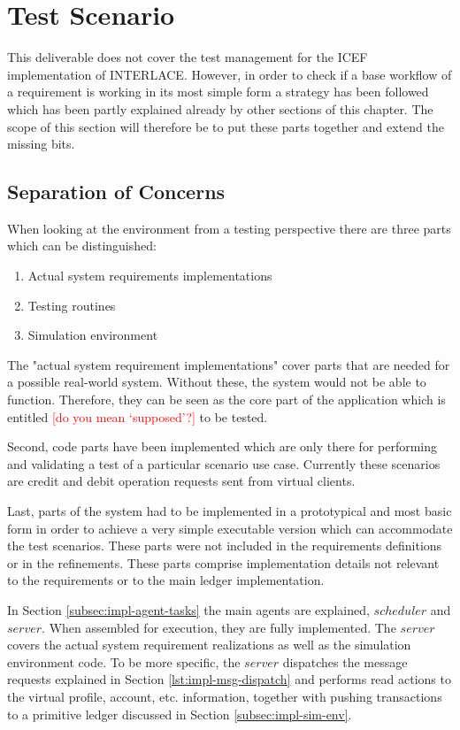 \section{Test Scenario}
\label{sec:impl-test}

This deliverable does not cover the test management for the ICEF implementation of INTERLACE. However, in order to check if a base workflow of a requirement is working in its most simple form a strategy has been followed which has been partly explained already by other sections of this chapter. The scope of this section will therefore be to put these parts together and extend the missing bits.

\subsection{Separation of Concerns}

When looking at the environment from a testing perspective there are three parts which can be distinguished:

\begin{enumerate}
	\item Actual system requirements implementations
	\item Testing routines
	\item Simulation environment
\end{enumerate}

The "actual system requirement implementations" cover parts that are needed for a possible real-world system. Without these, the system would not be able to function. Therefore, they can be seen as the core part of the application which is entitled \textcolor{red}{[do you mean `supposed'?]} to be tested.

Second, code parts have been implemented which are only there for performing and validating a test of a particular scenario use case. Currently these scenarios are credit and debit operation requests sent from virtual clients.

Last, parts of the system had to be implemented in a prototypical and most basic form in order to achieve a very simple executable version which can accommodate the test scenarios. These parts were not included in the requirements definitions or in the refinements. These parts comprise implementation details not relevant to the requirements or to the main ledger implementation.

In Section \ref{subsec:impl-agent-tasks} the main agents are explained, $scheduler$ and $server$. When assembled for execution, they are fully implemented. The $server$ covers the actual system requirement realizations as well as the simulation environment code. To be more specific, the $server$ dispatches the message requests explained in Section \ref{lst:impl-msg-dispatch} and performs read actions to the virtual profile, account, etc. information, together with pushing transactions to a primitive ledger discussed in Section \ref{subsec:impl-sim-env}.


